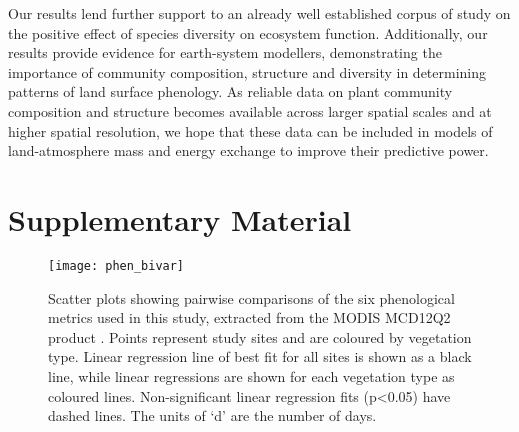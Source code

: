 \documentclass[11pt,a4paper]{article}
\newcommand{\beginsupplement}{%
	\setcounter{table}{0}
	\renewcommand{\thetable}{S\arabic{table}}%
	\setcounter{figure}{0}
	\renewcommand{\thefigure}{S\arabic{figure}}%
	}
\begin{document}
Our results lend further support to an already well established corpus of study
on the positive effect of species diversity on ecosystem function.
Additionally, our results provide evidence for earth-system modellers,
demonstrating the importance of community composition, structure and diversity
in determining patterns of land surface phenology. As reliable data on plant
community composition and structure becomes available across larger spatial
scales and at higher spatial resolution, we hope that these data can be
included in models of land-atmosphere mass and energy exchange to improve their
predictive power.

\printbibliography

\section{Supplementary Material}
\beginsupplement

\begin{figure}[H]
\centering
	\texttt{[image: phen\_bivar]}
	\caption{Scatter plots showing pairwise comparisons of the six phenological
		metrics used in this study, extracted from the MODIS MCD12Q2 product
		\citep{MCD12Q2}. Points represent study sites and are coloured by vegetation
		type. Linear regression line of best fit for all sites is shown as a black
		line, while linear regressions are shown for each vegetation type as coloured
		lines. Non-significant linear regression fits (p<0.05) have dashed lines. The
		units of `d' are the number of days.}
	\label{phen_bivar}
\end{figure}

\setlength{\tabcolsep}{1pt} %
\begin{landscape}

\end{landscape}
\setlength{\tabcolsep}{4pt} %
\end{document}

